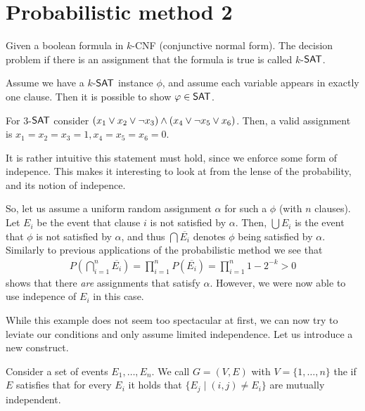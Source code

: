 
\section{Probabilistic method 2}
\begin{definition}
    Given a boolean formula in $k$-CNF (conjunctive normal form).
    The decision problem if there is an assignment that the formula is true is called $k$-$\mathsf{SAT}$.
\end{definition}
Assume we have a $k$-$\mathsf{SAT}$ instance $\phi$, and assume each variable appears in exactly one clause.
Then it is possible to show $\phi \in \SAT$.
\begin{example}
    For $3$-$\mathsf{SAT}$ consider $(x_1 \vee x_2 \vee \neg x_3) \wedge (x_4 \vee \neg x_5 \vee x_6)$.
    Then, a valid assignment is $x_1 = x_2 = x_3 = 1, x_4=x_5=x_6=0$.
\end{example}
It is rather intuitive this statement must hold, since we enforce some form of indepence.
This makes it interesting to look at from the lense of the probability, and its notion of indepence.

So, let us assume a uniform random assignment $\alpha$ for such a $\phi$ (with $n$ clauses).
Let $E_i$ be the event that clause $i$ is not satisfied by $\alpha$.
Then, $\bigcup E_i$ is the event that $\phi$ is not satisfied by $\alpha$, and thus
$\bigcap \overline{E_i}$ denotes $\phi$ being satisfied by $\alpha$.
Similarly to previous applications of the probabilistic method we see that
\begin{align}
    P\left(\bigcap_{i=1}^n \overline{E_i}\right) = \prod_{i=1}^n P(\overline{E_i}) = \prod_{i=1}^{n}1 - 2^{-k} > 0
\end{align}
shows that there \emph{are} assignments that satisfy $\alpha$.
However, we were now able to use indepence of $E_i$ in this case.

While this example does not seem too spectacular at first, we can now try to leviate our conditions
and only assume limited independence.
Let us introduce a new construct.
\begin{definition}
    Consider a set of events $E_1, \dots, E_n$.
    We call $G = (V,E)$ with $V= \{1, \dots, n\}$ the  if $E$ satisfies that
    for every $E_i$ it holds that $\{E_j \mid (i,j) \neq E_i \}$ are mutually independent.
\end{definition}

